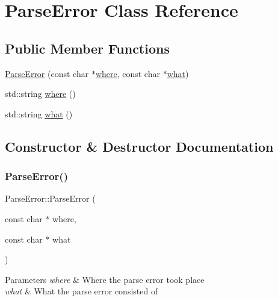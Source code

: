 \hypertarget{classParseError}{}\section{Parse\+Error Class Reference}
\label{classParseError}
\subsection*{Public Member Functions}
\begin{DoxyCompactItemize}
\item 
\mbox{\hyperlink{classParseError_a89210010aa80b9602ef5e57649886937}{Parse\+Error}} (const char $\ast$\mbox{\hyperlink{classParseError_aa725d47c84792c9142267e51c2074f58}{where}}, const char $\ast$\mbox{\hyperlink{classParseError_a08560dce27779ffee6c4bfb0d796aa6e}{what}})
\item 
std\+::string \mbox{\hyperlink{classParseError_aa725d47c84792c9142267e51c2074f58}{where}} ()
\item 
std\+::string \mbox{\hyperlink{classParseError_a08560dce27779ffee6c4bfb0d796aa6e}{what}} ()
\end{DoxyCompactItemize}


\subsection{Constructor \& Destructor Documentation}
\mbox{\label{classParseError_a89210010aa80b9602ef5e57649886937}} 
\subsubsection{\texorpdfstring{Parse\+Error()}{ParseError()}}
{\footnotesize\ttfamily Parse\+Error\+::\+Parse\+Error (\begin{DoxyParamCaption}\item[{const char $\ast$}]{where,  }\item[{const char $\ast$}]{what }\end{DoxyParamCaption})\hspace{0.3cm}{\ttfamily [inline]}}


\begin{DoxyParams}{Parameters}
{\em where} & Where the parse error took place\\
\hline
{\em what} & What the parse error consisted of \\
\hline
\end{DoxyParams}


